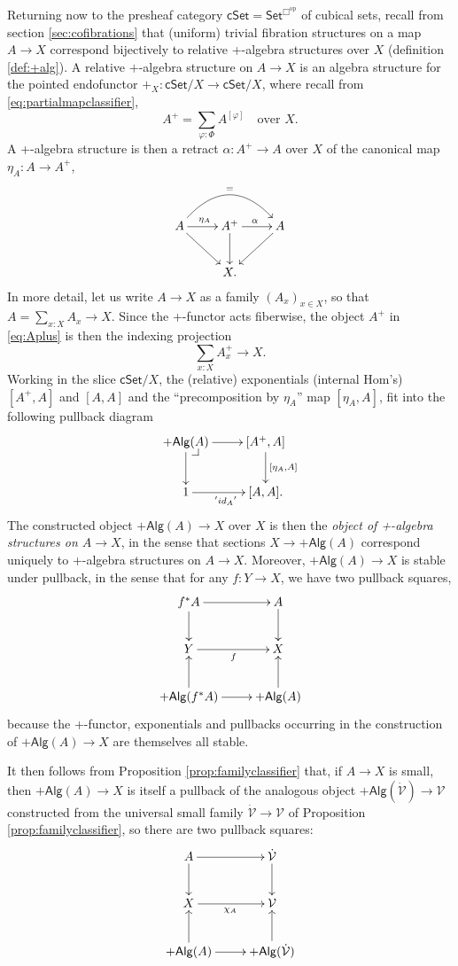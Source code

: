 \documentclass[12pt]{article}
\makeatletter
\newcommand{\psh}[1]{\ensuremath{\mathsf{Set}^{#1^{\mathrm{op}}}}}
\newcommand{\cSet}{\ensuremath{\mathsf{cSet}}}
\newcommand{\ra}{\ensuremath{\rightarrow}}
\newcommand{\V}{\ensuremath{\mathcal{V}}}
\newcommand{\VV}{\ensuremath{\dot{\mathcal{V}}}}
\theoremstyle{remark}
\theoremstyle{definition}
\newcommand{\pbcorner}[1][dr]{\save*!/#1-1.2pc/#1:(-1,1)@^{|-}\restore}
\makeatother
\begin{document}
Returning now to the presheaf category $\cSet = \psh{\Box}$ of cubical sets, recall from section \ref{sec:cofibrations} that (uniform) trivial fibration structures on a map $A\ra X$ correspond bijectively to relative +-algebra structures over $X$ (definition \ref{def:+alg}).  A relative $+$-algebra structure on $A \ra X$ is an algebra structure for the pointed endofunctor $+_X : \cSet/X \ra \cSet/X$, where recall from \eqref{eq:partialmapclassifier}, 
\[
A^+ = \sum_{\varphi:\Phi}A^{[\varphi]}\quad\text{over $X$}.
\]
A +-algebra structure is then a retract $\alpha : A^+\ra A$ over $X$ of the canonical map $\eta_A : A\ra A^+$,
\begin{equation}\label{eq:Aplus}
\xymatrix{
A\ar[rd] \ar[r]^{\eta_A} \ar@/^6ex/ [rr]^= & A^+ \ar[r]^{\alpha} \ar[d]& \ar[ld]A \\
& X. &
}
\end{equation}
In more detail, let us write $A\ra X$ as a family $(A_x)_{x\in X}$, so that $A=\sum_{x:X}A_x \ra X$. Since the +-functor acts fiberwise, the object $A^+$ in \eqref{eq:Aplus} is then the indexing projection
\[
\sum_{x:X}A^+_x \ra X.
\]
Working in the slice  $\cSet/X$, the (relative) exponentials (internal Hom's) $[A^+, A]$ and $[A, A]$ and the ``precomposition by $\eta_A$'' map $[\eta_A, A]$,  fit into the following pullback diagram 
\begin{equation}\label{diag:plualgstru}
\xymatrix{
+\mathsf{Alg}(A)\ar[d] \ar[r] \pbcorner & [A^+, A] \ar[d]^{[\eta_A, A]}\\
1 \ar[r]_{'{id_A}'} & [A, A].
}
\end{equation}
The constructed object $+\mathsf{Alg}(A) \ra X$ over $X$ is then the \emph{object of +-algebra structures on $A\ra X$}, in the sense that sections $X \ra +\mathsf{Alg}(A)$ correspond uniquely to +-algebra structures on $A\ra X$. Moreover, $+\mathsf{Alg}(A) \ra X$ is stable under pullback, in the sense that for any $f:Y\ra X$, we have two pullback squares,
\begin{equation}\label{diagram:pbplus}
\xymatrix{
f^*A \ar[d] \ar[r]  & A \ar[d]\\
Y \ar[r]_{f} &X\\
+\mathsf{Alg}(f^*A)\ar[u] \ar[r] & +\mathsf{Alg}(A)\ar[u].
}
\end{equation}
because the +-functor, exponentials and pullbacks occurring in the construction of $+\mathsf{Alg}(A) \ra X$ are themselves all stable. 

It then follows from Proposition \ref{prop:familyclassifier} that, if $A\ra X$ is small, then $+\mathsf{Alg}(A) \ra X$ is itself a pullback of the analogous object $+\mathsf{Alg}(\VV) \ra \V$ constructed from the universal small family $\VV\ra\V$ of Proposition \ref{prop:familyclassifier}, so there are two pullback squares:
\begin{equation}\label{diagram:tfib1}
\xymatrix{
A \ar[d] \ar[r]  & \VV \ar[d]\\
X \ar[r]_{\chi_A} & \V\\
+\mathsf{Alg}(A)\ar[u] \ar[r] & +\mathsf{Alg}(\VV)\ar[u].
}
\end{equation}
\end{document}
